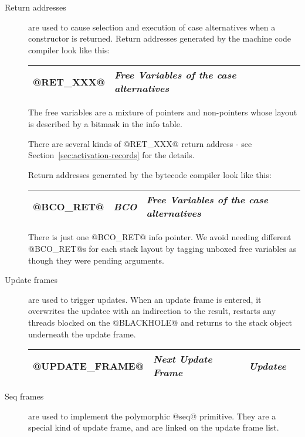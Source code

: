 \documentclass[11pt]{article}
\newcommand{\secref}[1]{Section~\ref{sec:#1}}
\begin{document}
\begin{description}

\item[Return addresses] are used to cause selection and execution of
case alternatives when a constructor is returned.  Return addresses
generated by the machine code compiler look like this:

\begin{center}
\begin{tabular}{|l|l|l|l|}\hline
@RET_XXX@ & \emph{Free Variables of the case alternatives} \\ \hline
\end{tabular}
\end{center}

The free variables are a mixture of pointers and non-pointers whose
layout is described by a bitmask in the info table.

There are several kinds of @RET_XXX@ return address - see
\secref{activation-records} for the details.

Return addresses generated by the bytecode compiler look like this:
\begin{center}
\begin{tabular}{|l|l|l|l|}\hline
@BCO_RET@ & \emph{BCO} & \emph{Free Variables of the case alternatives} \\ \hline
\end{tabular}
\end{center}

There is just one @BCO_RET@ info pointer.  We avoid needing different
@BCO_RET@s for each stack layout by tagging unboxed free variables as
though they were pending arguments.

\item[Update frames] are used to trigger updates.  When an update
frame is entered, it overwrites the updatee with an indirection to the
result, restarts any threads blocked on the @BLACKHOLE@ and returns to
the stack object underneath the update frame.

\begin{center}
\begin{tabular}{|l|l|l|l|}\hline
@UPDATE_FRAME@ & \emph{Next Update Frame} & \emph{Updatee} \\ \hline
\end{tabular}
\end{center}

\item[Seq frames] are used to implement the polymorphic @seq@
primitive.  They are a special kind of update frame, and are linked on
the update frame list.


\end{description}
\end{document}
